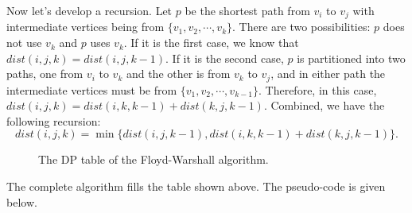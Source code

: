 Now let's develop a recursion.
Let $p$ be the shortest path from $v_i$ to $v_j$ with 
intermediate vertices being from $\{v_1, v_2, \cdots, v_k\}$.
There are two possibilities: $p$ does not use $v_k$ and $p$ uses $v_k$.
If it is the first case, we know that $dist(i,j,k) = dist(i,j,k-1)$.
If it is the second case, $p$ is partitioned into two paths, one from $v_i$ to $v_k$ and the other is from $v_k$ to $v_j$,
and in either path the 
intermediate vertices must be from $\{v_1, v_2, \cdots, v_{k-1}\}$.
Therefore, in this case, $dist(i,j,k) = dist(i,k,k-1) + dist(k,j,k-1)$.
Combined, we have the following recursion:
$$dist(i,j,k) = \min\{dist(i,j,k-1), dist(i,k,k-1) + dist(k,j,k-1)\}.$$

\begin{figure}[h]
\centering{}
\caption{The DP table of the Floyd-Warshall algorithm.}
\label{fig:floyd}
\end{figure}

The complete algorithm fills the table shown above. 
The pseudo-code is given below.

\begin{minipage}{0.8\textwidth}
	\xxx
	\xxx
	\xxx
	\xxx
	\xxx
	\xxx
	\xxx
	\xxx
	\xxx
	\xxx
	\xxx
	\xxx
	\xxx
\end{minipage}



